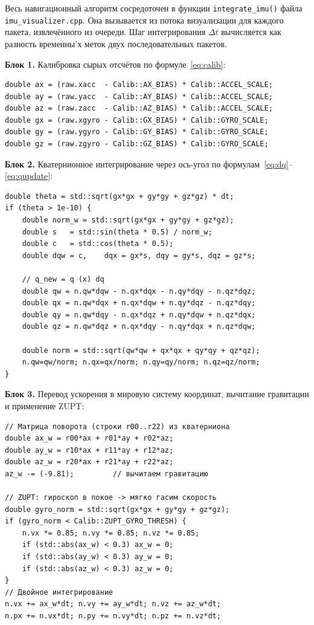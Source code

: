 Весь навигационный алгоритм сосредоточен в функции \texttt{integrate\_imu()}
файла \texttt{imu\_visualizer.cpp}. Она вызывается из потока визуализации для
каждого пакета, извлечённого из очереди. Шаг интегрирования $\Delta t$
вычисляется как разность временны'х меток двух последовательных пакетов.
 
\textbf{Блок 1.} Калибровка сырых отсчётов по формуле~\eqref{eq:calib}:
 
\begin{lstlisting}[caption={Калибровка сырых показаний}]
double ax = (raw.xacc  - Calib::AX_BIAS) * Calib::ACCEL_SCALE;
double ay = (raw.yacc  - Calib::AY_BIAS) * Calib::ACCEL_SCALE;
double az = (raw.zacc  - Calib::AZ_BIAS) * Calib::ACCEL_SCALE;
double gx = (raw.xgyro - Calib::GX_BIAS) * Calib::GYRO_SCALE;
double gy = (raw.ygyro - Calib::GY_BIAS) * Calib::GYRO_SCALE;
double gz = (raw.zgyro - Calib::GZ_BIAS) * Calib::GYRO_SCALE;
\end{lstlisting}
 
\textbf{Блок 2.} Кватернионное интегрирование через ось-угол по
формулам~\eqref{eq:dq}--\eqref{eq:qupdate}:
 
\begin{lstlisting}[caption={Кватернионное интегрирование гироскопа}]
double theta = std::sqrt(gx*gx + gy*gy + gz*gz) * dt;
if (theta > 1e-10) {
    double norm_w = std::sqrt(gx*gx + gy*gy + gz*gz);
    double s   = std::sin(theta * 0.5) / norm_w;
    double c   = std::cos(theta * 0.5);
    double dqw = c,    dqx = gx*s, dqy = gy*s, dqz = gz*s;
 
    // q_new = q (x) dq
    double qw = n.qw*dqw - n.qx*dqx - n.qy*dqy - n.qz*dqz;
    double qx = n.qw*dqx + n.qx*dqw + n.qy*dqz - n.qz*dqy;
    double qy = n.qw*dqy - n.qx*dqz + n.qy*dqw + n.qz*dqx;
    double qz = n.qw*dqz + n.qx*dqy - n.qy*dqx + n.qz*dqw;
 
    double norm = std::sqrt(qw*qw + qx*qx + qy*qy + qz*qz);
    n.qw=qw/norm; n.qx=qx/norm; n.qy=qy/norm; n.qz=qz/norm;
}
\end{lstlisting}
 
\textbf{Блок 3.} Перевод ускорения в мировую систему координат,
вычитание гравитации и применение ZUPT:
 
\begin{lstlisting}[caption={Мировое ускорение, компенсация гравитации и ZUPT}]
// Матрица поворота (строки r00..r22) из кватерниона
double ax_w = r00*ax + r01*ay + r02*az;
double ay_w = r10*ax + r11*ay + r12*az;
double az_w = r20*ax + r21*ay + r22*az;
az_w -= (-9.81);         // вычитаем гравитацию
 
// ZUPT: гироскоп в покое -> мягко гасим скорость
double gyro_norm = std::sqrt(gx*gx + gy*gy + gz*gz);
if (gyro_norm < Calib::ZUPT_GYRO_THRESH) {
    n.vx *= 0.85; n.vy *= 0.85; n.vz *= 0.85;
    if (std::abs(ax_w) < 0.3) ax_w = 0;
    if (std::abs(ay_w) < 0.3) ay_w = 0;
    if (std::abs(az_w) < 0.3) az_w = 0;
}
// Двойное интегрирование
n.vx += ax_w*dt; n.vy += ay_w*dt; n.vz += az_w*dt;
n.px += n.vx*dt; n.py += n.vy*dt; n.pz += n.vz*dt;
\end{lstlisting}
 
